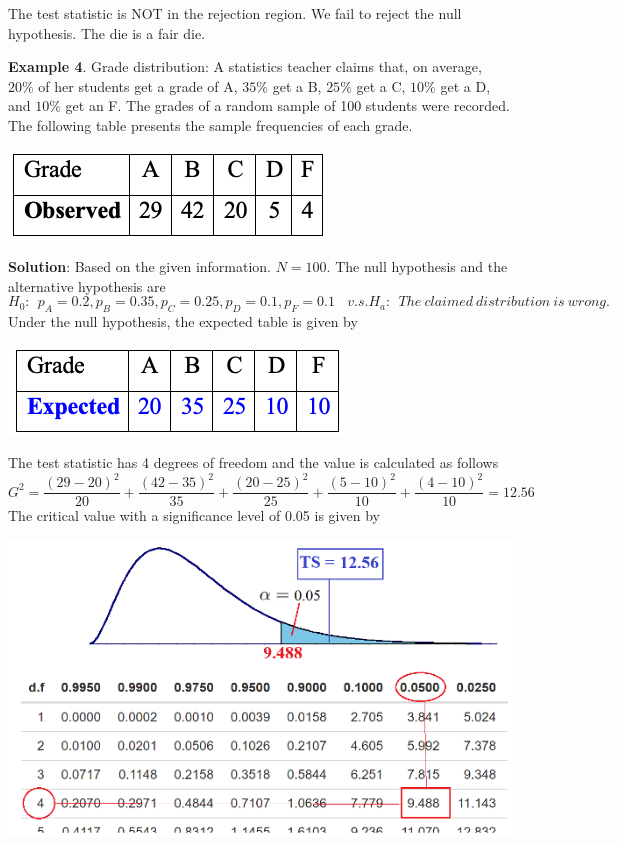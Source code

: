 \documentclass[
]{book}
\begin{document}
The test statistic is NOT in the rejection region. We fail to reject the null hypothesis. The die is a fair die.

\textbf{Example 4}. Grade distribution: A statistics teacher claims that, on average, \(20\%\) of her students get a grade of A, \(35\%\) get a B, \(25\%\) get a C, \(10\%\) get a D, and \(10\%\) get an F. The grades of a random sample of 100 students were recorded. The following table presents the sample frequencies of each grade.

\begin{center}\includegraphics[width=0.25\linewidth]{week13/example04Data} \end{center}

\textbf{Solution}: Based on the given information. \(N = 100\). The null hypothesis and the alternative hypothesis are
\[
H_0: \ \ p_A = 0.2, p_B = 0.35, p_C = 0.25, p_D = 0.1, p_F = 0.1 \ \ \ \ v.s. H_a: \ \ The \ claimed \ distribution \ is \ wrong.
\]
Under the null hypothesis, the expected table is given by

\begin{center}\includegraphics[width=0.25\linewidth]{week13/example04ExpTable} \end{center}

The test statistic has 4 degrees of freedom and the value is calculated as follows
\[
G^2=\frac{(29-20)^2}{20}+\frac{(42-35)^2}{35}+\frac{(20-25)^2}{25}+\frac{(5-10)^2}{10}+\frac{(4-10)^2}{10}=12.56
\]
The critical value with a significance level of 0.05 is given by

\begin{center}\includegraphics[width=0.75\linewidth]{week13/example04CV} \end{center}
\end{document}
